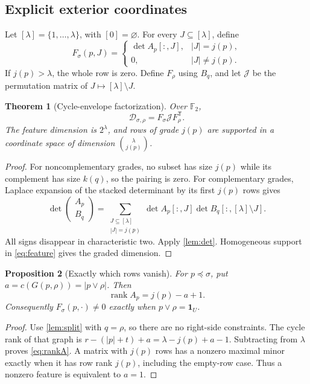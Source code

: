 \documentclass[11pt,a4paper]{article}
\newtheorem{theorem}{Theorem}[section]
\newtheorem{proposition}[theorem]{Proposition}
\theoremstyle{definition}
\theoremstyle{remark}
\newcommand{\F}{\mathbb F_2}
\newcommand{\rk}{\operatorname{rank}}
\newcommand{\one}{\mathbf 1}
\begin{document}
\subsection{Explicit exterior coordinates}
Let $[\lambda]=\{1,\ldots,\lambda\}$, with $[0]=\varnothing$. For every
$J\subseteq[\lambda]$, define
\begin{equation}
 F_\sigma(p,J)=
 \begin{cases}\det A_p[:,J],& |J|=j(p),\\0,&|J|\ne j(p).\end{cases}
 \label{eq:feature}
\end{equation}
If $j(p)>\lambda$, the whole row is zero. Define $F_\rho$ using $B_q$, and let
$\mathcal J$ be the permutation matrix of $J\mapsto[\lambda]\setminus J$.

\begin{theorem}[Cycle-envelope factorization]\label{thm:factor}
Over $\F$,
\begin{equation}
              \mathcal D_{\sigma,\rho}=F_\sigma\mathcal JF_\rho^{\mathsf T}.
 \label{eq:factor}
\end{equation}
The feature dimension is $2^\lambda$, and rows of grade $j(p)$ are supported in a
coordinate space of dimension $\binom\lambda{j(p)}$.
\end{theorem}
\begin{proof}
For noncomplementary grades, no subset has size $j(p)$ while its complement has size
$k(q)$, so the pairing is zero. For complementary grades, Laplace expansion of the
stacked determinant by its first $j(p)$ rows gives
\[
 \det\begin{pmatrix}A_p\\B_q\end{pmatrix}
 =\sum_{\substack{J\subseteq[\lambda]\\ |J|=j(p)}}
          \det A_p[:,J]\det B_q[:,[\lambda]\setminus J].
\]
All signs disappear in characteristic two. Apply \cref{lem:det}. Homogeneous support
in \eqref{eq:feature} gives the graded dimension.
\end{proof}

\begin{proposition}[Exactly which rows vanish]\label{prop:zero}
For $p\preceq\sigma$, put $a=c(G(p,\rho))=|p\vee\rho|$. Then
\begin{equation}
                         \rk A_p=j(p)-a+1.
 \label{eq:rankA}
\end{equation}
Consequently $F_\sigma(p,\cdot)\ne0$ exactly when $p\vee\rho=\one_U$.
\end{proposition}
\begin{proof}
Use \cref{lem:split} with $q=\rho$, so there are no right-side constraints. The cycle
rank of that graph is
$r-(|p|+t)+a=\lambda-j(p)+a-1$.
Subtracting from $\lambda$ proves \eqref{eq:rankA}. A matrix with $j(p)$ rows has a
nonzero maximal minor exactly when it has row rank $j(p)$, including the empty-row case.
Thus a nonzero feature is equivalent to $a=1$.
\end{proof}
\end{document}
